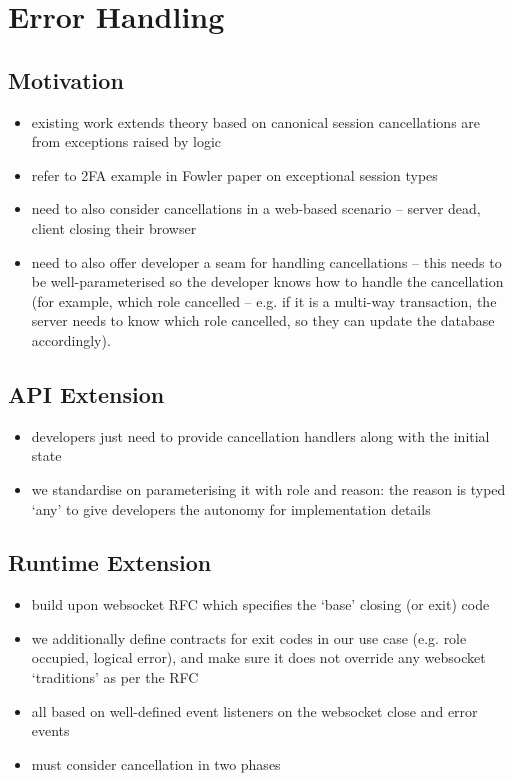 \section{Error Handling}
\label{section:error}

\subsection{Motivation}
\begin{itemize}
\item existing work extends theory based on canonical session cancellations are from exceptions raised by logic
\item refer to 2FA example in Fowler paper on exceptional session types
\item need to also consider cancellations in a web-based scenario -- server dead, client closing their browser
\item need to also offer developer a seam for handling cancellations -- this needs to be well-parameterised so the developer knows how to handle the cancellation (for example, which role cancelled -- e.g. if it is a multi-way transaction, the server needs to know which role cancelled, so they can update the database accordingly).
\end{itemize}

\subsection{API Extension}
\begin{itemize}
\item developers just need to provide cancellation handlers along with the initial state
\item we standardise on parameterising it with role and reason: the reason is typed `any' to give developers the autonomy for implementation details
\end{itemize}

\subsection{Runtime Extension}
\begin{itemize}
\item build upon websocket RFC which specifies the `base' closing (or exit) code
\item we additionally define contracts for exit codes in our use case (e.g. role occupied, logical error), and make sure it does not override any websocket `traditions' as per the RFC
\item all based on well-defined event listeners on the websocket close and error events
\item must consider cancellation in two phases
\end{itemize}

